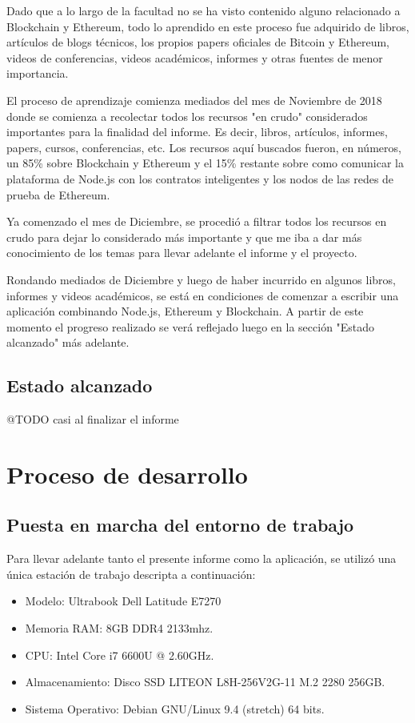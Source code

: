 Dado que a lo largo de la facultad no se ha visto contenido alguno relacionado a Blockchain y 
Ethereum, todo lo aprendido en este proceso fue adquirido de libros, artículos de blogs 
técnicos, los propios papers oficiales de Bitcoin y Ethereum, videos de conferencias, videos 
académicos, informes y otras fuentes de menor importancia.

El proceso de aprendizaje comienza mediados del mes de Noviembre de 2018 donde se comienza a 
recolectar todos los recursos "en crudo" considerados importantes para la finalidad del informe.
Es decir, libros, artículos, informes, papers, cursos, conferencias, etc. Los recursos aquí 
buscados fueron, en números, un 85\% sobre Blockchain y Ethereum y el 15\% restante sobre como
comunicar la plataforma de Node.js con los contratos inteligentes y los nodos de las redes de 
prueba de Ethereum.

Ya comenzado el mes de Diciembre, se procedió a filtrar todos los recursos en crudo para dejar
lo considerado más importante y que me iba a dar más conocimiento de los temas para llevar adelante
el informe y el proyecto.

Rondando mediados de Diciembre y luego de haber incurrido en algunos libros, informes y videos 
académicos, se está en condiciones de comenzar a escribir una aplicación combinando Node.js, 
Ethereum y Blockchain. A partir de este momento el progreso realizado se verá reflejado luego 
en la sección "Estado alcanzado" más adelante.


\subsection{Estado alcanzado}
@TODO casi al finalizar el informe

\section{Proceso de desarrollo}

\subsection{Puesta en marcha del entorno de trabajo}

Para llevar adelante tanto el presente informe como la aplicación, se utilizó una única estación
de trabajo descripta a continuación:

\begin{itemize}
\item Modelo: Ultrabook Dell Latitude E7270
\item Memoria RAM: 8GB DDR4 2133mhz.
\item CPU: Intel Core i7 6600U @ 2.60GHz.
\item Almacenamiento: Disco SSD LITEON L8H-256V2G-11 M.2 2280 256GB.
\item Sistema Operativo: Debian GNU/Linux 9.4 (stretch) 64 bits.
\end{itemize}


